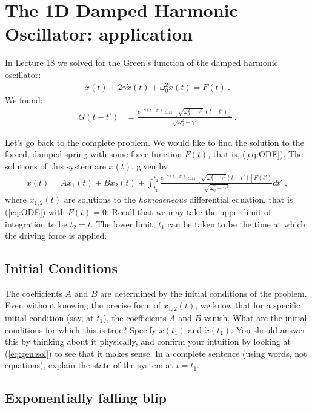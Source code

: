 \documentclass[12pt]{article}
\numberwithin{equation}{section}    %
\begin{document}
\section{The 1D Damped Harmonic Oscillator: application}

In Lecture 18 we solved for the Green's function of the damped harmonic oscillator:
\begin{align}
	\ddot x(t) + 2 \gamma \dot x(t) + \omega_0^2 x(t) = F(t) \ .
	\label{eq:ODE}
\end{align}
 We found:
\begin{align}
	G(t-t') &= \frac{
	e^{-\gamma(t-t')} 
	\sin\left[\sqrt{\omega_0^2-\gamma^2}\, (t-t')\right]
	}{\sqrt{\omega_0^2-\gamma^2}} \ .
\end{align}

Let's go back to the complete problem. We would like to find the solution to the forced, damped spring with some force function $F(t)$, that is, (\ref{eq:ODE}). The solutions of this system are $x(t)$, given by 
\begin{align}
	x(t) = A x_1(t) + B x_2(t) 
	+ 
	\int_{t_1}^{t_2}
	\frac{
	e^{-\gamma(t-t')}
	\sin \left[
	\sqrt{\omega_0^2 - \gamma^2} (t-t')
	\right]
	F(t')
	}{
	\sqrt{\omega_0^2 - \gamma^2}
	}
	dt' \ ,
	\label{eq:gen:sol}
\end{align}
where $x_{1,2}(t)$ are solutions to the \emph{homogeneous} differential equation, that is (\ref{eq:ODE}) with $F(t)=0$. 
%
Recall that we may take the upper limit of integration to be $t_2 = t$. The lower limit, $t_1$ can be taken to be the time at which the driving force is applied. 

\subsection{Initial Conditions}

The coefficients $A$ and $B$ are determined by the initial conditions of the problem. 
%
Even without knowing the precise form of $x_{1,2}(t)$, we know that for a specific initial condition (say, at $t_1$), the coefficients $A$ and $B$ vanish. What are the initial conditions for which this is true? Specify $x(t_1)$ and $\dot x(t_1)$. You should answer this by thinking about it physically, and confirm your intuition by looking at (\ref{eq:gen:sol}) to see that it makes sense. In a complete sentence (using words, not equations), explain the state of the system at $t=t_1$. 

\subsection{Exponentially falling blip}
\end{document}
